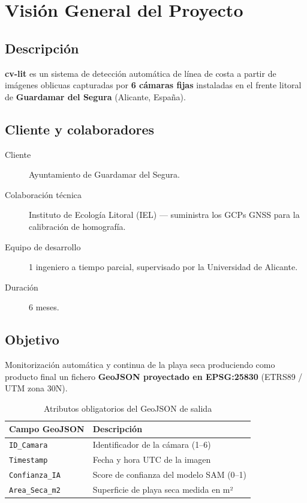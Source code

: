 \chapter{Visión General del Proyecto}

\section{Descripción}

\textbf{cv-lit} es un sistema de detección automática de línea de costa a partir de imágenes
oblicuas capturadas por \textbf{6 cámaras fijas} instaladas en el frente litoral de
\textbf{Guardamar del Segura} (Alicante, España).

\section{Cliente y colaboradores}

\begin{description}
  \item[Cliente] Ayuntamiento de Guardamar del Segura.
  \item[Colaboración técnica] Instituto de Ecología Litoral (IEL) — suministra
        los GCPs GNSS para la calibración de homografía.
  \item[Equipo de desarrollo] 1 ingeniero a tiempo parcial, supervisado por la
        Universidad de Alicante.
  \item[Duración] 6 meses.
\end{description}

\section{Objetivo}

Monitorización automática y continua de la playa seca produciendo como
producto final un fichero \textbf{GeoJSON proyectado en EPSG:25830}
(ETRS89 / UTM zona 30N).

\begin{table}[h!]
\centering
\begin{tabular}{lp{9cm}}
\toprule
\textbf{Campo GeoJSON} & \textbf{Descripción} \\
\midrule
\texttt{ID\_Camara}     & Identificador de la cámara (1--6) \\
\texttt{Timestamp}      & Fecha y hora UTC de la imagen \\
\texttt{Confianza\_IA}  & Score de confianza del modelo SAM (0--1) \\
\texttt{Area\_Seca\_m2} & Superficie de playa seca medida en m² \\
\bottomrule
\end{tabular}
\caption{Atributos obligatorios del GeoJSON de salida}
\end{table}

